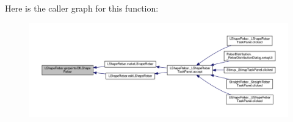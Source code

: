 Here is the caller graph for this function\+:\nopagebreak
\begin{figure}[H]
\begin{center}
\leavevmode
\includegraphics[width=350pt]{namespaceLShapeRebar_a3019960c6f6476cb70df9ee06f330dfb_icgraph}
\end{center}
\end{figure}


